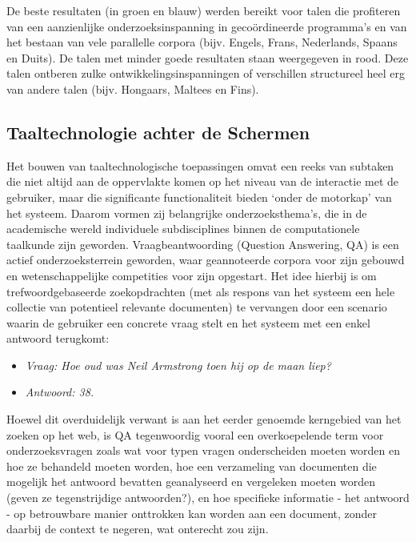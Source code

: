 \begin{multicols}{2}
    De beste resultaten (in groen en blauw) werden bereikt voor talen die profiteren van een aanzienlijke onderzoeksinspanning in geco{\"o}rdineerde programma's en van het bestaan van vele parallelle corpora (bijv. Engels, Frans, Nederlands, Spaans en Duits). De talen met minder goede resultaten staan weergegeven in rood. Deze talen ontberen zulke ontwikkelingsinspanningen of verschillen structureel heel erg van andere talen (bijv. Hongaars, Maltees en Fins).

\subsection{Taaltechnologie achter de Schermen}

    Het bouwen van taaltechnologische toepassingen omvat een reeks van subtaken die niet altijd aan de oppervlakte komen op het niveau van de interactie met de gebruiker, maar die significante functionaliteit bieden `onder de motorkap' van het systeem. Daarom vormen zij belangrijke onderzoeksthema's, die in de academische wereld individuele subdisciplines binnen de computationele taalkunde zijn geworden.
    Vraagbeantwoording (Question Answering, QA) is een actief onderzoeksterrein geworden, waar geannoteerde corpora voor zijn gebouwd en wetenschappelijke competities voor zijn opgestart. Het idee hierbij is om trefwoordgebaseerde zoekopdrachten (met als respons van het systeem een hele collectie van potentieel relevante documenten) te vervangen door een scenario waarin de gebruiker een concrete vraag stelt en het systeem met een enkel antwoord terugkomt:

\begin{itemize}
\item[] \textit{Vraag: Hoe oud was Neil Armstrong toen hij op de maan liep?}
\item[] \textit{Antwoord: 38.}
\end{itemize}

 Hoewel dit overduidelijk verwant is aan het eerder genoemde kerngebied van het zoeken op het web, is QA tegenwoordig vooral een overkoepelende term voor onderzoeksvragen zoals wat voor typen vragen onderscheiden moeten worden en hoe ze behandeld moeten worden, hoe een verzameling van documenten die mogelijk het antwoord bevatten geanalyseerd en vergeleken moeten worden (geven ze tegenstrijdige antwoorden?), en hoe specifieke informatie - het antwoord - op betrouwbare manier onttrokken kan worden aan een document, zonder daarbij de context te negeren, wat onterecht zou zijn.


\end{multicols}
